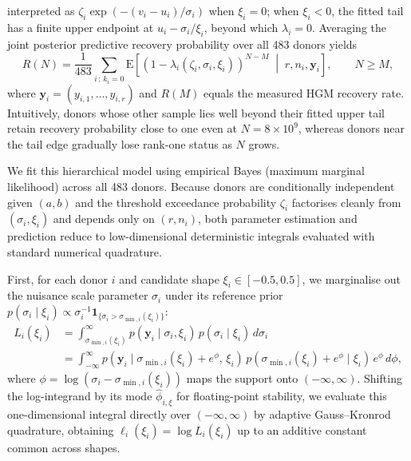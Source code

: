 \documentclass[11pt,a4paper]{article}
\begin{document}
interpreted as $\zeta_i \exp(-(v_i - u_i)/\sigma_i)$ when $\xi_i = 0$; when $\xi_i < 0$, the fitted tail has a finite upper endpoint at $u_i - \sigma_i / \xi_i$, beyond which $\lambda_i = 0$. Averaging the joint posterior predictive recovery probability over all 483 donors yields
\[
    R(N) = \frac{1}{483}\sum_{i\,:\,k_i = 0} \mathrm{E}\!\left[\left(1 - \lambda_i(\zeta_i, \sigma_i, \xi_i)\right)^{N - M} \;\middle|\; r, n_i, \mathbf{y}_i\right], \qquad N \ge M,
\]
where $\mathbf{y}_i = (y_{i,1}, \dots, y_{i,r})$ and $R(M)$ equals the measured HGM recovery rate. Intuitively, donors whose other sample lies well beyond their fitted upper tail retain recovery probability close to one even at $N = 8\times10^9$, whereas donors near the tail edge gradually lose rank-one status as $N$ grows.

We fit this hierarchical model using empirical Bayes (maximum marginal likelihood) across all 483 donors. Because donors are conditionally independent given $(a, b)$ and the threshold exceedance probability $\zeta_i$ factorises cleanly from $(\sigma_i, \xi_i)$ and depends only on $(r, n_i)$, both parameter estimation and prediction reduce to low-dimensional deterministic integrals evaluated with standard numerical quadrature.

First, for each donor $i$ and candidate shape $\xi_i \in [-0.5, 0.5]$, we marginalise out the nuisance scale parameter $\sigma_i$ under its reference prior $p(\sigma_i \mid \xi_i) \propto \sigma_i^{-1}\mathbf{1}_{\{\sigma_i > \sigma_{\min,i}(\xi_i)\}}$:
\begin{align*}
    L_i(\xi_i) &= \int_{\sigma_{\min,i}(\xi_i)}^{\infty} p(\mathbf{y}_i \mid \sigma_i, \xi_i)\, p(\sigma_i \mid \xi_i)\, d\sigma_i \\
               &= \int_{ -\infty }^{ \infty } p\!\left(\mathbf{y}_i \mid \sigma_{\min,i}(\xi_i) + e^\phi,\, \xi_i\right)\, p\!\left(\sigma_{\min,i}(\xi_i) + e^\phi \mid \xi_i\right)\, e^\phi\, d\phi,
\end{align*}
where $\phi = \log(\sigma_i - \sigma_{\min,i}(\xi_i))$ maps the support onto $(-\infty, \infty)$. Shifting the log-integrand by its mode $\hat{\phi}_{i,\xi}$ for floating-point stability, we evaluate this one-dimensional integral directly over $(-\infty, \infty)$ by adaptive Gauss--Kronrod quadrature, obtaining $\ell_i(\xi_i) = \log L_i(\xi_i)$ up to an additive constant common across shapes.
\end{document}
